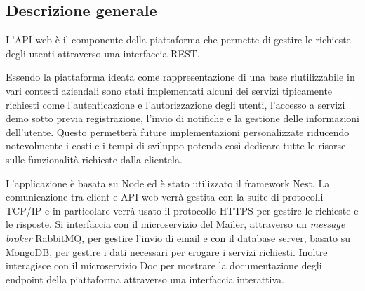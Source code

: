 \subsection{Descrizione generale}
L'API web è il componente della piattaforma che permette di gestire le richieste degli utenti attraverso una interfaccia REST.

Essendo la piattaforma ideata come rappresentazione di una base riutilizzabile in vari contesti aziendali sono stati implementati alcuni dei servizi
tipicamente richiesti come l'autenticazione e l'autorizzazione degli utenti, l'accesso a servizi demo sotto previa registrazione, l'invio di notifiche e
la gestione delle informazioni dell'utente. Questo permetterà future implementazioni personalizzate riducendo notevolmente i costi e i tempi di sviluppo potendo così dedicare
tutte le risorse sulle funzionalità richieste dalla clientela.

L'applicazione è basata su Node ed è stato utilizzato il framework Nest.
La comunicazione tra client e API web verrà gestita con la suite di protocolli TCP/IP e in particolare verrà usato il protocollo HTTPS per gestire
le richieste e le risposte.
Si interfaccia con il microservizio del Mailer, attraverso un \textit{message broker} RabbitMQ, per gestire l'invio di email e con il database server, basato su MongoDB, per gestire i dati necessari
per erogare i servizi richiesti. Inoltre interagisce con il microservizio Doc per mostrare la documentazione degli endpoint della piattaforma attraverso
una interfaccia interattiva.
